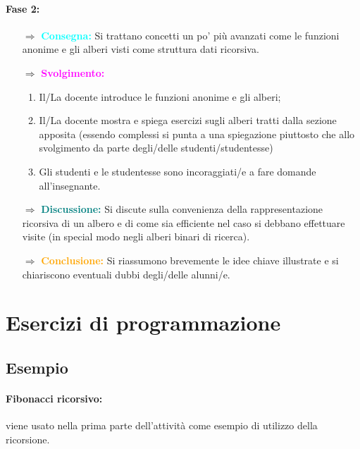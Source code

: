
\paragraph{Fase 2:}

\begin{itemize}
    \item [$\Rightarrow$] \textbf{\textcolor{cyan}{Consegna:}} Si trattano concetti un po' più avanzati come le funzioni anonime
    e gli alberi visti come struttura dati ricorsiva.
    \item [$\Rightarrow$] \textbf{\textcolor{magenta}{Svolgimento:}}
    \begin{enumerate}
        \item Il/La docente introduce le funzioni anonime e gli alberi;
        \item Il/La docente mostra e spiega esercizi sugli alberi tratti dalla sezione apposita (essendo complessi si punta a una spiegazione piuttosto che allo svolgimento da parte degli/delle studenti/studentesse)
        \item Gli studenti e le studentesse sono incoraggiati/e a fare domande all'insegnante.
    \end{enumerate}
    \item [$\Rightarrow$] \textbf{\textcolor{teal}{Discussione:}} Si discute sulla convenienza della rappresentazione ricorsiva di un albero e di
    come sia efficiente nel caso si debbano effettuare visite (in special modo negli alberi binari di ricerca).
    \item [$\Rightarrow$] \textbf{\textcolor{orange}{Conclusione:}} Si riassumono brevemente le idee chiave illustrate e si chiariscono eventuali dubbi degli/delle alunni/e.
\end{itemize}

\pagebreak

\section{Esercizi di programmazione}\label{prog}

\subsection{Esempio}

\paragraph{Fibonacci ricorsivo:} viene usato nella prima parte dell'attività come esempio
di utilizzo della ricorsione.

